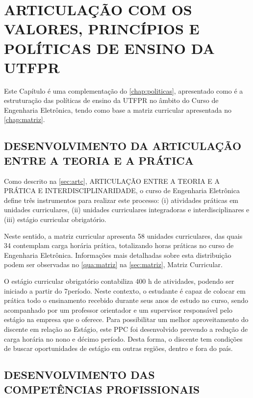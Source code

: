 \chapter{ARTICULAÇÃO COM OS VALORES, PRINCÍPIOS E POLÍTICAS DE ENSINO DA UTFPR}

Este Capítulo é uma complementação do \autoref{chap:politicas}, apresentado como é a estruturação das políticas de ensino da UTFPR no âmbito do Curso de Engenharia Eletrônica, tendo como base a matriz curricular apresentada no \autoref{chap:matriz}.

\section{DESENVOLVIMENTO DA ARTICULAÇÃO ENTRE A TEORIA E A PRÁTICA}

Como descrito na \autoref{sec:artc}, ARTICULAÇÃO ENTRE A TEORIA E A PRÁTICA E INTERDISCIPLINARIDADE, o curso de Engenharia Eletrônica define três instrumentos para realizar este processo: (i) atividades práticas em unidades curriculares, (ii) unidades curriculares integradoras e interdisciplinares e (iii) estágio curricular obrigatório.

Neste sentido, a matriz curricular apresenta 58 unidades curriculares, das quais 34 contemplam carga horária prática, totalizando \the\value{horasAP} horas práticas no curso de Engenharia Eletrônica. Informações mais detalhadas sobre esta distribuição podem ser observadas no \autoref{qua:matriz} na \autoref{sec:matriz}, Matriz Curricular.



O estágio curricular obrigatório contabiliza 400 h de atividades, podendo ser iniciado a partir do 7\textordmasculine período. Neste contexto, o estudante é capaz de colocar em prática todo o ensinamento recebido durante seus anos de estudo no curso, sendo acompanhado por um professor orientador e um supervisor responsável pelo estágio na empresa que o oferece. Para possibilitar um melhor aproveitamento do discente em relação ao Estágio, este PPC foi desenvolvido prevendo a redução de carga horária no nono e décimo período. Desta forma, o discente tem condições de buscar oportunidades de estágio em outras regiões, dentro e fora do país.

\section{DESENVOLVIMENTO DAS COMPETÊNCIAS PROFISSIONAIS}
\label{sec:comp}